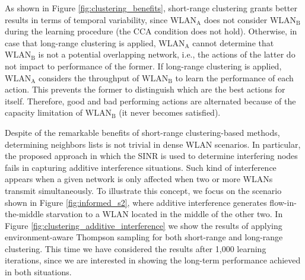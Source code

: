\documentclass[preprint,12pt]{elsarticle}
\begin{document}
As shown in Figure \ref{fig:clustering_benefits}, short-range clustering grants better results in terms of temporal variability, since $\text{WLAN}_\text{A}$ does not consider $\text{WLAN}_\text{B}$ during the learning procedure (the CCA condition does not hold). Otherwise, in case that long-range clustering is applied, $\text{WLAN}_\text{A}$ cannot determine that $\text{WLAN}_\text{B}$ is not a potential overlapping network, i.e., the actions of the latter do not impact to performance of the former. If long-range clustering is applied, $\text{WLAN}_\text{A}$ considers the throughput of $\text{WLAN}_\text{B}$ to learn the performance of each action. This prevents the former to distinguish which are the best actions for itself. Therefore, good and bad performing actions are alternated because of the capacity limitation of $\text{WLAN}_\text{B}$ (it never becomes satisfied).

Despite of the remarkable benefits of short-range clustering-based methods, determining neighbors lists is not trivial in dense WLAN scenarios. In particular, the proposed approach in which the SINR is used to determine interfering nodes fails in capturing additive interference situations. Such kind of interference appears when a given network is only affected when two or more WLANs transmit simultaneously. To illustrate this concept, we focus on the scenario shown in Figure \ref{fig:informed_s2}, where additive interference generates flow-in-the-middle starvation to a WLAN located in the middle of the other two. In Figure \ref{fig:clustering_additive_interference} we show the results of applying environment-aware Thompson sampling for both short-range and long-range clustering. This time we have considered the results after 1,000 learning iterations, since we are interested in showing the long-term performance achieved in both situations.
\end{document}
